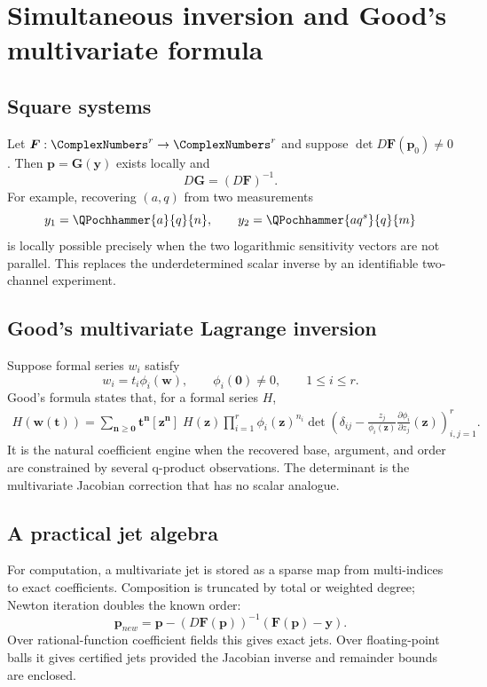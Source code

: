 \documentclass[11pt,letterpaper,oneside,openany]{book}
\theoremstyle{definition}
\theoremstyle{remark}
\begin{document}
\chapter{Simultaneous inversion and Good's multivariate formula}

\section{Square systems}
Let \(\bm F:\ComplexNumbers^r\to\ComplexNumbers^r\) and suppose
\(\det D\bm F(\bm p_0)\ne0\).  Then \(\bm p=\bm G(\bm y)\) exists locally and
\[
 D\bm G=(D\bm F)^{-1}.
\]
For example, recovering \((a,q)\) from two measurements
\[
 y_1=\QPochhammer{a}{q}{n},
 \qquad
 y_2=\QPochhammer{aq^s}{q}{m}
\]
is locally possible precisely when the two logarithmic sensitivity vectors are
not parallel.  This replaces the underdetermined scalar inverse by an
identifiable two-channel experiment.

\section{Good's multivariate Lagrange inversion}
Suppose formal series \(w_i\) satisfy
\[
 w_i=t_i\phi_i(\bm w),
 \qquad \phi_i(\bm0)\ne0,
 \qquad 1\le i\le r.
\]
Good's formula \cite{Good1960} states that, for a formal series \(H\),
\begin{align}
 H(\bm w(\bm t))
 =\sum_{\bm n\ge\bm0}\bm t^{\bm n}
 [\bm z^{\bm n}]\;H(\bm z)
 \prod_{i=1}^r\phi_i(\bm z)^{n_i}
 \det\left(\delta_{ij}-
 \frac{z_j}{\phi_i(\bm z)}\frac{\partial\phi_i}{\partial z_j}(\bm z)
 \right)_{i,j=1}^r.
 \label{eq:good}
\end{align}
It is the natural coefficient engine when the recovered base, argument, and
order are constrained by several q-product observations.  The determinant is
the multivariate Jacobian correction that has no scalar analogue.

\section{A practical jet algebra}
For computation, a multivariate jet is stored as a sparse map from multi-indices
to exact coefficients.  Composition is truncated by total or weighted degree;
Newton iteration doubles the known order:
\[
 \bm p_{new}=\bm p-(D\bm F(\bm p))^{-1}
 ( \bm F(\bm p)-\bm y).
\]
Over rational-function coefficient fields this gives exact jets.  Over
floating-point balls it gives certified jets provided the Jacobian inverse and
remainder bounds are enclosed.
\end{document}

